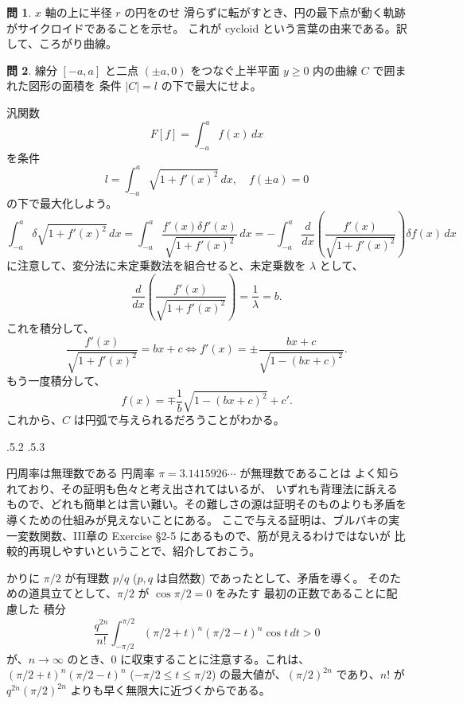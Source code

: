 \documentclass[a4paper]{jsarticle}
\makeatletter
\renewcommand{\appendix}{\par
  \setcounter{section}{0}%
  \setcounter{subsection}{0}%
  \gdef\presectionname{\appendixname}%
  \gdef\postsectionname{}%
  \gdef\thesection{\@Alph\c@section}%
  \gdef\thesubsection{\thesection.\@arabic\c@subsection}%
  \if@twocolumn
    \renewcommand{\section}{%
      \@startsection{section}{1}{\z@}%
      {0.6\Cvs}{0.4\Cvs}%
      {\normalfont\large\headfont\raggedright\presectionname}}
%
  \else
    \renewcommand{\section}{%
      \if@slide\clearpage\fi
      \@startsection{section}{1}{\z@}%
      {\Cvs \@plus.5\Cdp \@minus.2\Cdp}%
      {.5\Cvs \@plus.3\Cdp}%
      {\normalfont\Large\headfont\raggedright\presectionname}}
  \fi
  }
\theoremstyle{definition}
\newtheorem{Exercise}{問}%
\theoremstyle{remark}
\makeatother
\begin{document}
\begin{Exercise}
  $x$ 軸の上に半径 $r$ の円をのせ 滑らずに転がすとき、円の最下点が動く軌跡がサイクロイドであることを示せ。
  これが cycloid という言葉の由来である。訳して、ころがり曲線。
\end{Exercise}

\begin{Exercise}
線分 $[-a,a]$ と二点 $(\pm a,0)$ をつなぐ上半平面 $y \geq 0$ 内の曲線 $C$ で囲まれた図形の面積を
条件 $|C| = l$ の下で最大にせよ。
\end{Exercise}

汎関数
\[ 
F[f] = \int_{-a}^a f(x)\, dx 
\]
を条件
\[ 
l = \int_{-a}^a \sqrt{1 + f'(x)^2}\, dx, 
\quad 
f(\pm a) = 0
\] 
の下で最大化しよう。
\[ 
\int_{-a}^a 
\delta \sqrt{1 + f'(x)^2}\, dx 
= \int_{-a}^a \frac{f'(x) \delta f'(x)}{\sqrt{1 + f'(x)^2}}\, dx 
= - \int_{-a}^a \frac{d}{dx}\left(\frac{f'(x)}{\sqrt{1 + f'(x)^2}}\right) \delta f(x)\, dx 
\] 
に注意して、変分法に未定乗数法を組合せると、未定乗数を $\lambda$ として、
\[ 
\frac{d}{dx}\left(\frac{f'(x)}{\sqrt{1 + f'(x)^2}}\right) = \frac{1}{\lambda} = b. 
\] 
これを積分して、
\[ 
\frac{f'(x)}{\sqrt{1 + f'(x)^2}} = bx + c
\iff
f'(x) = \pm \frac{bx + c}{\sqrt{1 - (bx+c)^2}}.  
\] 
もう一度積分して、
\[ 
f(x) = \mp \frac{1}{b} \sqrt{1-(bx+c)^2} + c'. 
\] 
これから、$C$ は円弧で与えられるだろうことがわかる。


\bigskip
\appendix

\section{円周率は無理数である}
円周率 $\pi = 3.1415926\cdots$ が無理数であることは よく知られており、その証明も色々と考え出されてはいるが、
いずれも背理法に訴えるもので、どれも簡単とは言い難い。その難しさの源は証明そのものよりも矛盾を導くための仕組みが見えないことにある。
ここで与える証明は、ブルバキの実一変数関数、III章の Exercise \S2-5 にあるもので、筋が見えるわけではないが 比較的再現しやすいということで、紹介しておこう。

かりに $\pi/2$ が有理数 $p/q$ ($p,q$ は自然数) であったとして、矛盾を導く。
そのための道具立てとして、$\pi/2$ が $\cos\pi/2 = 0$ をみたす 最初の正数であることに配慮した
積分
\[
 \frac{q^{2n}}{n!} \int_{-\pi/2}^{\pi/2} (\pi/2 + t)^n(\pi/2 - t)^n \cos t\, dt > 0
\]
が、$n \to \infty$ のとき、$0$ に収束することに注意する。これは、
$(\pi/2 + t)^n(\pi/2-t)^n$ ($-\pi/2 \leq t \leq \pi/2$) の最大値が、$(\pi/2)^{2n}$ であり、$n!$ が $q^{2n} (\pi/2)^{2n}$ よりも早く無限大に近づくからである。
\end{document}
